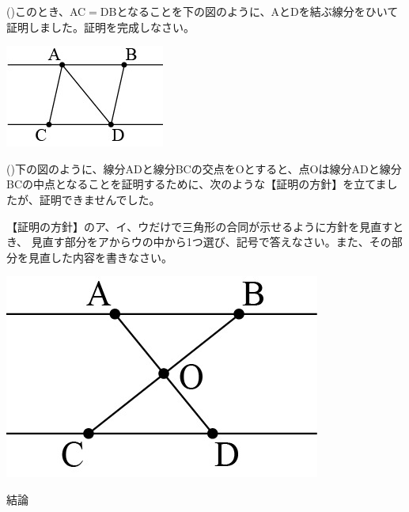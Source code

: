 \documentclass[
  12pt,a4paper,lualatex,ja=standard]{bxjsarticle}
\begin{document}
\begin{flushleft}
\begin{multicols}{2}
\end{multicols}

()\hspace{2.5pt}このとき、AC$=$DBとなることを下の図のように、AとDを結ぶ線分をひいて証明しました。証明を完成しなさい。

\begin{center}
\def\@captype{figure}
\includegraphics{image23.jpg}

\end{center}

\vspace{15mm}

()\hspace{2.5pt}下の図のように、線分ADと線分BCの交点をOとすると、点Oは線分ADと線分BCの中点となることを証明するために、次のような【証明の方針】を立てましたが、証明できませんでした。

【証明の方針】のア、イ、ウだけで三角形の合同が示せるように方針を見直すとき、
見直す部分をアからウの中から1つ選び、記号で答えなさい。また、その部分を見直した内容を書きなさい。

\begin{multicols}{2}

\begin{center}
\def\@captype{figure}
\includegraphics{image37.jpg}

\end{center}

\begin{framed}
結論


\end{framed}
\end{multicols}
\end{flushleft}
\end{document}

